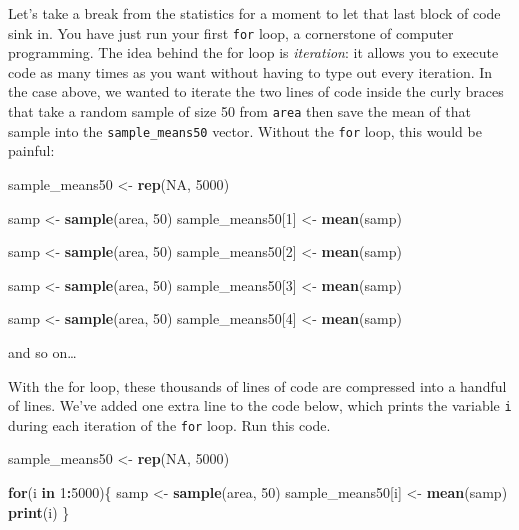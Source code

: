 \documentclass[]{book}
\newenvironment{Shaded}{\begin{snugshade}}{\end{snugshade}}
\newcommand{\KeywordTok}[1]{\textcolor[rgb]{0.13,0.29,0.53}{\textbf{#1}}}
\newcommand{\DecValTok}[1]{\textcolor[rgb]{0.00,0.00,0.81}{#1}}
\newcommand{\StringTok}[1]{\textcolor[rgb]{0.31,0.60,0.02}{#1}}
\newcommand{\OtherTok}[1]{\textcolor[rgb]{0.56,0.35,0.01}{#1}}
\newcommand{\ControlFlowTok}[1]{\textcolor[rgb]{0.13,0.29,0.53}{\textbf{#1}}}
\newcommand{\OperatorTok}[1]{\textcolor[rgb]{0.81,0.36,0.00}{\textbf{#1}}}
\newcommand{\NormalTok}[1]{#1}
\theoremstyle{definition}
\theoremstyle{definition}
\theoremstyle{definition}
\theoremstyle{remark}
\begin{document}
Let's take a break from the statistics for a moment to let that last
block of code sink in. You have just run your first \texttt{for} loop, a
cornerstone of computer programming. The idea behind the for loop is
\emph{iteration}: it allows you to execute code as many times as you
want without having to type out every iteration. In the case above, we
wanted to iterate the two lines of code inside the curly braces that
take a random sample of size 50 from \texttt{area} then save the mean of
that sample into the \texttt{sample\_means50} vector. Without the
\texttt{for} loop, this would be painful:

\begin{Shaded}
\begin{Highlighting}[]
\NormalTok{sample_means50 <-}\StringTok{ }\KeywordTok{rep}\NormalTok{(}\OtherTok{NA}\NormalTok{, }\DecValTok{5000}\NormalTok{)}

\NormalTok{samp <-}\StringTok{ }\KeywordTok{sample}\NormalTok{(area, }\DecValTok{50}\NormalTok{)}
\NormalTok{sample_means50[}\DecValTok{1}\NormalTok{] <-}\StringTok{ }\KeywordTok{mean}\NormalTok{(samp)}

\NormalTok{samp <-}\StringTok{ }\KeywordTok{sample}\NormalTok{(area, }\DecValTok{50}\NormalTok{)}
\NormalTok{sample_means50[}\DecValTok{2}\NormalTok{] <-}\StringTok{ }\KeywordTok{mean}\NormalTok{(samp)}

\NormalTok{samp <-}\StringTok{ }\KeywordTok{sample}\NormalTok{(area, }\DecValTok{50}\NormalTok{)}
\NormalTok{sample_means50[}\DecValTok{3}\NormalTok{] <-}\StringTok{ }\KeywordTok{mean}\NormalTok{(samp)}

\NormalTok{samp <-}\StringTok{ }\KeywordTok{sample}\NormalTok{(area, }\DecValTok{50}\NormalTok{)}
\NormalTok{sample_means50[}\DecValTok{4}\NormalTok{] <-}\StringTok{ }\KeywordTok{mean}\NormalTok{(samp)}
\end{Highlighting}
\end{Shaded}

and so on\ldots{}

With the for loop, these thousands of lines of code are compressed into
a handful of lines. We've added one extra line to the code below, which
prints the variable \texttt{i} during each iteration of the \texttt{for}
loop. Run this code.

\begin{Shaded}
\begin{Highlighting}[]
\NormalTok{sample_means50 <-}\StringTok{ }\KeywordTok{rep}\NormalTok{(}\OtherTok{NA}\NormalTok{, }\DecValTok{5000}\NormalTok{)}

\ControlFlowTok{for}\NormalTok{(i }\ControlFlowTok{in} \DecValTok{1}\OperatorTok{:}\DecValTok{5000}\NormalTok{)\{}
\NormalTok{   samp <-}\StringTok{ }\KeywordTok{sample}\NormalTok{(area, }\DecValTok{50}\NormalTok{)}
\NormalTok{   sample_means50[i] <-}\StringTok{ }\KeywordTok{mean}\NormalTok{(samp)}
   \KeywordTok{print}\NormalTok{(i)}
\NormalTok{   \}}
\end{Highlighting}
\end{Shaded}
\end{document}
